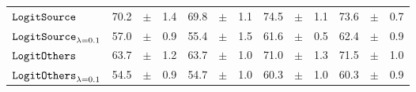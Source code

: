 \documentclass[../main.tex]{subfiles}
\begin{document}
\begin{tabular}{lrrrrrrrrrrrr}
$\mathtt{LogitSource}_{}$               & 70.2                            & $\pm$                                        & 1.4                        & 69.8                                                                                   & $\pm$ & 1.1                                & 74.5  & $\pm$ & 1.1             & 73.6  & $\pm$ & 0.7                           \\
$\mathtt{LogitSource}_{\lambda=0.1}$    & 57.0                            & $\pm$                                        & 0.9                        & 55.4                                                                                   & $\pm$ & 1.5                                & 61.6  & $\pm$ & 0.5             & 62.4  & $\pm$ & 0.9                           \\
$\mathtt{LogitOthers}_{}$               & 63.7                            & $\pm$                                        & 1.2                        & 63.7                                                                                 & $\pm$ & 1.0                                & 71.0  & $\pm$ & 1.3             & 71.5  & $\pm$ & 1.0                           \\
$\mathtt{LogitOthers}_{\lambda=0.1}$    & 54.5                            & $\pm$                                        & 0.9                        & 54.7                                                                                   & $\pm$ & 1.0                                & 60.3  & $\pm$ & 1.0             & 60.3  & $\pm$ & 0.9                           \\
\bottomrule
\end{tabular}
\end{document}
